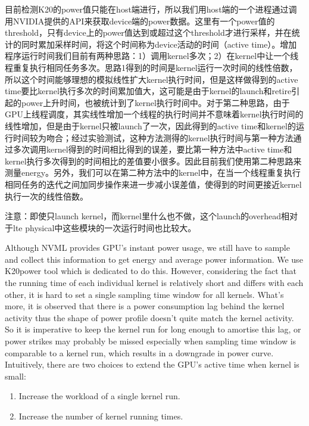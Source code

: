 \documentclass[titlepage]{article}
\numberwithin{figure}{section}
\numberwithin{equation}{section}
\begin{document}
目前检测K20的power值只能在host端进行，所以我们用host端的一个进程通过调用NVIDIA提供的API来获取device端的power数据。这里有一个power值的threshold，只有device上的power值达到或超过这个threshold才进行采样，并在统计的同时累加采样时间，将这个时间称为device活动的时间（active time）。增加程序运行时间我们目前有两种思路：1）调用kernel多次；2）在kernel中让一个线程重复执行相同任务多次。思路1得到的时间是kernel运行一次时间的线性倍数，所以这个时间能够理想的模拟线性扩大kernel执行时间，但是这样做得到的active time要比kernel执行多次的时间累加值大，这可能是由于kernel的launch和retire引起的power上升时间，也被统计到了kernel执行时间中。对于第二种思路，由于GPU上线程调度，其实线性增加一个线程的执行时间并不意味着kernel执行时间的线性增加，但是由于kernel只被launch了一次，因此得到的active time和kernel的运行时间较为吻合；经过实验测试，这种方法测得的kernel执行时间与第一种方法通过多次调用kernel得到的时间相比得到的误差，要比第一种方法中active time和kernel执行多次得到的时间相比的差值要小很多。因此目前我们使用第二种思路来测量energy。另外，我们可以在第二种方法中的kernel中，在当一个线程重复执行相同任务的迭代之间加同步操作来进一步减小误差值，使得到的时间更接近kernel执行一次的线性倍数。

注意：即使只launch kernel，而kernel里什么也不做，这个launch的overhead相对于lte physical中这些模块的一次运行时间也比较大。

Although NVML provides GPU's instant power usage, we still have to sample and collect this information to get energy and average power information. We use K20power\cite{k20power@gpgpu7} tool which is dedicated to do this. However, considering the fact that the running time of each individual kernel is relatively short and differs with each other, it is hard to set a single sampling time window for all kernels. What's more, it is observed that there is a power consumption lag behind the kernel activity thus the shape of power profile doesn't quite match the kernel activity\cite{k20power@gpgpu7}. So it is imperative to keep the kernel run for long enough to amortise this lag, or power strikes may probably be missed especially when sampling time window is comparable to a kernel run, which results in a downgrade in power curve. Intuitively, there are two choices to extend the GPU's active time when kernel is small:

\begin{enumerate}
\item Increase the workload of a single kernel run.
\item Increase the number of kernel running times.
\end{enumerate}
\end{document}
